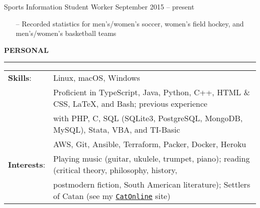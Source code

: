 \documentclass[paper=a4, fontsize=11pt]{scrartcl} %
\newcommand{\I}{--}
\newenvironment{mycenter}[1][\topsep]
  {\setlength{\topsep}{#1}\par\kern\topsep\centering}%
  {\par\kern\topsep}%
\begin{document}
Sports Information Student Worker \hfill September 2015 -- present
\begin{itemize}[topsep=0pt,noitemsep]
	\item[\I] Recorded statistics for men's/women's soccer, women's field hockey, and men's/women's basketball teams
\end{itemize}

\vspace{2mm}

\begin{mycenter}[0pt]
\textsc{\textbf{PERSONAL}}
\end{mycenter}

\vspace{-3mm}
\rule{\textwidth}{0.4pt}

\vspace{1.5mm}

\begin{tabularx}{\linewidth}{ll}

\hspace{-3mm}
\textbf{Skills}: & Linux, macOS, Windows \\
  & Proficient in TypeScript, Java, Python, C++, HTML \& CSS, \LaTeX, and Bash; previous experience \\
  & with PHP, C, SQL (SQLite3, PostgreSQL, MongoDB, MySQL), Stata, VBA, and TI-Basic \\
  & AWS, Git, Ansible, Terraform, Packer, Docker, Heroku\\[1mm]

\hspace{-3mm}
\textbf{Interests}: & Playing music (guitar, ukulele, trumpet, piano); reading (critical theory, philosophy, history, \\
 & postmodern fiction, South American literature); Settlers of Catan (see my \texttt{\href{http://catonline.murp.us/}{CatOnline}} site) \\[1mm]

\end{tabularx}
\end{document}
